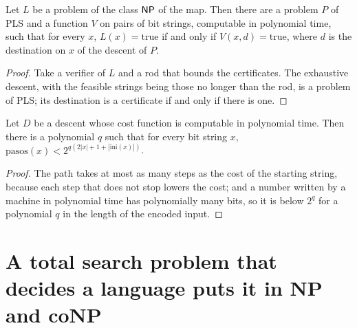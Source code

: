 \begin{theorem}
  \label{thm:search-np-por-pls}
  \leanok
  Let $L$ be a problem of the class $\mathsf{NP}$ of the map. Then there are a problem $P$ of PLS and a
  function $V$ on pairs of bit strings, computable in polynomial time, such that for every $x$,
  $L(x) = \mathrm{true}$ if and only if $V(x, d) = \mathrm{true}$, where $d$ is the destination
  on $x$ of the descent of $P$.
\end{theorem}

\begin{proof}
  \leanok
  Take a verifier of $L$ and a rod that bounds the certificates. The exhaustive descent, with the
  feasible strings being those no longer than the rod, is a problem of PLS; its destination is a
  certificate if and only if there is one.
\end{proof}

\begin{theorem}
  \label{thm:search-pasos-exponencial}
  \leanok
  Let $D$ be a descent whose cost function is computable in polynomial time. Then there is a
  polynomial $q$ such that for every bit string $x$,
  $\mathrm{pasos}(x) < 2^{q(2|x| + 1 + |\mathrm{ini}(x)|)}$.
\end{theorem}

\begin{proof}
  \leanok
  The path takes at most as many steps as the cost of the starting string, because each step that
  does not stop lowers the cost; and a number written by a machine in polynomial time has
  polynomially many bits, so it is below $2^{q}$ for a polynomial $q$ in the length of the encoded
  input.
\end{proof}

\section{A total search problem that decides a language puts it in NP and coNP}
\label{sec:search-tfnp-conp}

